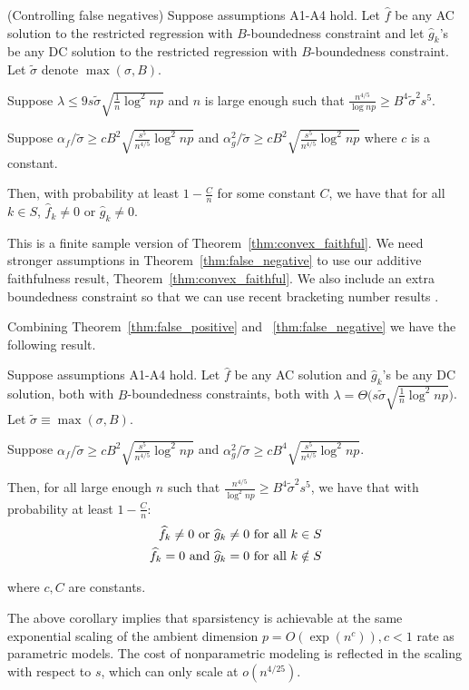 \begin{theorem} (Controlling false negatives) 
\label{thm:false_negative}
Suppose assumptions A1-A4 hold. Let $\hat{f}$ be any AC solution to the restricted regression with $B$-boundedness constraint and let $\hat{g}_k$'s be any DC solution to the restricted regression with $B$-boundedness constraint. Let $\tilde{\sigma}$ denote $\max(\sigma, B)$.

Suppose $\lambda \leq 9 s \tilde{\sigma} \sqrt{\frac{1}{n} \log^2 np}$ and $n$ is large enough such that $\frac{n^{4/5}}{\log np} \geq B^4 \tilde{\sigma}^2 s^5$. 

Suppose 
$\alpha_f/\tilde{\sigma} \geq c B^2 \sqrt{\frac{s^5}{n^{4/5}} \log^2 np}$ and $\alpha_g^2/\tilde{\sigma} \geq c B^2 \sqrt{\frac{s^5}{n^{4/5}} \log^2 np}$ where $c$ is a constant.

Then, with probability at least $1 - \frac{C}{n}$ for some constant $C$, we have that for all $k \in S$, $\hat{f}_k \neq 0$ or $\hat{g}_k \neq 0$. 

\end{theorem}

This is a finite sample version of
Theorem~\ref{thm:convex_faithful}. We need stronger assumptions in
Theorem~\ref{thm:false_negative} to use our additive faithfulness
result, Theorem~\ref{thm:convex_faithful}. We also include an extra
boundedness constraint so that we can use recent bracketing number
results \cite{kim2014global}.

Combining Theorem~\ref{thm:false_positive} and
~\ref{thm:false_negative} 
we have the following result.
\begin{corollary}
Suppose assumptions A1-A4 hold. Let $\hat{f}$ be any AC solution and $\hat{g}_k$'s be any DC solution, both with $B$-boundedness constraints, both with 
$\lambda = \Theta\big( s \tilde{\sigma} \sqrt{\frac{1}{n} \log^2 np} \big) $. Let $\tilde{\sigma} \equiv \max(\sigma, B)$.


Suppose 
$\alpha_f/\tilde{\sigma} \geq c B^2 \sqrt{\frac{s^5}{n^{4/5}} \log^2 np}$ and $\alpha_g^2/\tilde{\sigma} \geq c B^4 \sqrt{\frac{s^5}{n^{4/5}} \log^2 np}$.

Then, for all large enough $n$ such that $\frac{n^{4/5}}{\log^2 np} \geq B^4 \tilde{\sigma}^2 s^5$, we have that with probability at least $1-\frac{C}{n}$:
\begin{align*}
\widehat{f}_k \neq 0 \textrm{ or } \widehat{g}_k \neq 0 &\textrm{ for all } k \in S\\
\widehat{f}_k = 0 \textrm{ and } \widehat{g}_k = 0 & \textrm{ for all } k \notin S
\end{align*}

where $c,C$ are constants.

\end{corollary}
The above corollary implies that sparsistency is achievable at the same exponential scaling of the ambient dimension $p = O(\exp(n^c)), c<1$ rate as parametric models. The cost of nonparametric modeling is reflected in the scaling with respect to $s$, which can only scale at $o(n^{4/25})$.

